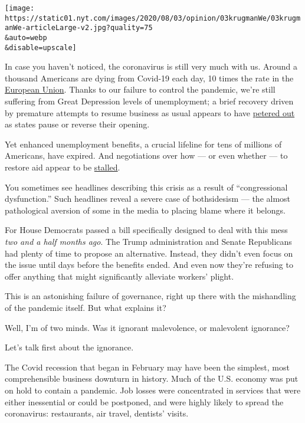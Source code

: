 \texttt{[image: https://static01.nyt.com/images/2020/08/03/opinion/03krugmanWe/03krugmanWe-articleLarge-v2.jpg?quality=75\\\&auto=webp\\\&disable=upscale]}

In case you haven't noticed, the coronavirus is still very much with us.
Around a thousand Americans are dying from Covid-19 each day, 10 times
the rate in the
\href{https://ourworldindata.org/coronavirus-data-explorer?zoomToSelection=true\&deathsMetric=true\&interval=smoothed\&smoothing=7\&country=USA~EuropeanUnion\&pickerMetric=location\&pickerSort=asc}{European
Union}. Thanks to our failure to control the pandemic, we're still
suffering from Great Depression levels of unemployment; a brief recovery
driven by premature attempts to resume business as usual appears to have
\href{https://www.calculatedriskblog.com/2020/08/forecasts-for-july-employment-report.html}{petered
out} as states pause or reverse their opening.

Yet enhanced unemployment benefits, a crucial lifeline for tens of
millions of Americans, have expired. And negotiations over how --- or
even whether --- to restore aid appear to be
\href{https://www.nytimes.com/2020/08/02/us/politics/coronavirus-jobless-aid.html?action=click\&module=Top\%20Stories\&pgtype=Homepage}{stalled}.

You sometimes see headlines describing this crisis as a result of
``congressional dysfunction.'' Such headlines reveal a severe case of
bothsidesism --- the almost pathological aversion of some in the media
to placing blame where it belongs.

For House Democrats passed a bill specifically designed to deal with
this mess \emph{two and a half months ago}. The Trump administration and
Senate Republicans had plenty of time to propose an alternative.
Instead, they didn't even focus on the issue until days before the
benefits ended. And even now they're refusing to offer anything that
might significantly alleviate workers' plight.

This is an astonishing failure of governance, right up there with the
mishandling of the pandemic itself. But what explains it?

Well, I'm of two minds. Was it ignorant malevolence, or malevolent
ignorance?

Let's talk first about the ignorance.

The Covid recession that began in February may have been the simplest,
most comprehensible business downturn in history. Much of the U.S.
economy was put on hold to contain a pandemic. Job losses were
concentrated in services that were either inessential or could be
postponed, and were highly likely to spread the coronavirus:
restaurants, air travel, dentists' visits.

